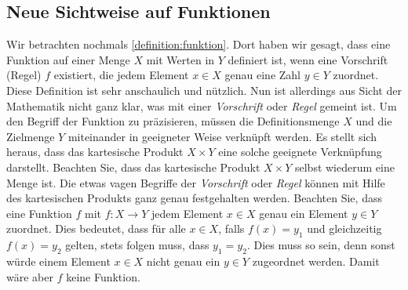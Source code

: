 \subsection{Neue Sichtweise auf Funktionen}
Wir betrachten nochmals \cref{definition:funktion}. Dort haben wir gesagt, dass eine Funktion auf einer Menge $X$ mit Werten in $Y$ definiert ist, wenn eine Vorschrift (Regel) $f$ existiert, die jedem Element $x\in X$ genau eine Zahl $y\in Y$ zuordnet. Diese Definition ist sehr anschaulich und nützlich. Nun ist allerdings aus Sicht der Mathematik nicht ganz klar, was mit einer \textit{Vorschrift} oder \textit{Regel} gemeint ist. Um den Begriff der Funktion zu präzisieren, müssen die Definitionsmenge $X$ und die Zielmenge $Y$ miteinander in geeigneter Weise verknüpft werden. Es stellt sich heraus, dass das kartesische Produkt $X\times Y$ eine solche geeignete Verknüpfung darstellt. Beachten Sie, dass das kartesische Produkt $X\times Y$ selbst wiederum eine Menge ist. Die etwas vagen Begriffe der \textit{Vorschrift} oder \textit{Regel} können mit Hilfe des kartesischen Produkts ganz genau festgehalten werden. Beachten Sie, dass eine Funktion $f$ mit $f: X\to Y$ jedem Element $x\in X$ genau ein Element $y\in Y$ zuordnet. Dies bedeutet, dass für alle $x\in X$, falls $f(x)=y_1$ und gleichzeitig $f(x)=y_2$ gelten, stets folgen muss, dass $y_1=y_2$. Dies muss so sein, denn sonst würde einem Element $x\in X$ nicht genau ein $y\in Y$ zugeordnet werden. Damit wäre aber $f$ keine Funktion.

